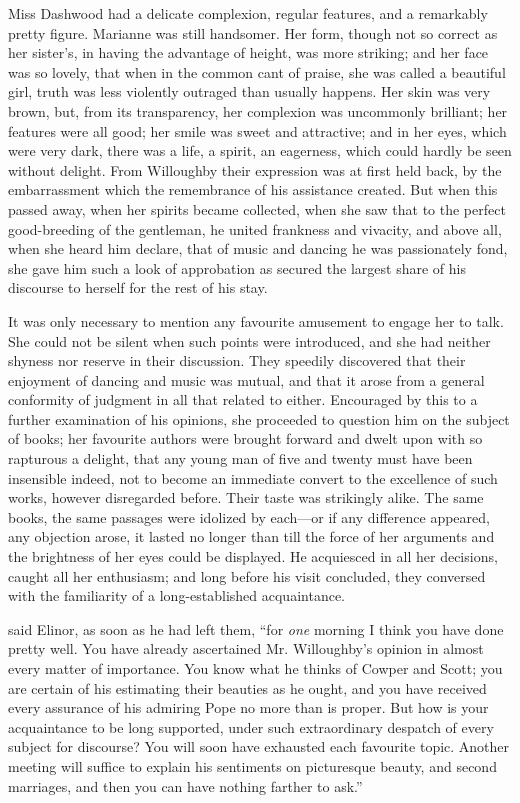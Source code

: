 Miss Dashwood had a delicate complexion, regular features, and a remarkably pretty figure. Marianne was still handsomer. Her form, though not so correct as her sister's, in having the advantage of height, was more striking; and her face was so lovely, that when in the common cant of praise, she was called a beautiful girl, truth was less violently outraged than usually happens. Her skin was very brown, but, from its transparency, her complexion was uncommonly brilliant; her features were all good; her smile was sweet and attractive; and in her eyes, which were very dark, there was a life, a spirit, an eagerness, which could hardly be seen without delight. From Willoughby their expression was at first held back, by the embarrassment which the remembrance of his assistance created. But when this passed away, when her spirits became collected, when she saw that to the perfect good-breeding of the gentleman, he united frankness and vivacity, and above all, when she heard him declare, that of music and dancing he was passionately fond, she gave him such a look of approbation as secured the largest share of his discourse to herself for the rest of his stay.

It was only necessary to mention any favourite amusement to engage her to talk. She could not be silent when such points were introduced, and she had neither shyness nor reserve in their discussion. They speedily discovered that their enjoyment of dancing and music was mutual, and that it arose from a general conformity of judgment in all that related to either. Encouraged by this to a further examination of his opinions, she proceeded to question him on the subject of books; her favourite authors were brought forward and dwelt upon with so rapturous a delight, that any young man of five and twenty must have been insensible indeed, not to become an immediate convert to the excellence of such works, however disregarded before. Their taste was strikingly alike. The same books, the same passages were idolized by each---or if any difference appeared, any objection arose, it lasted no longer than till the force of her arguments and the brightness of her eyes could be displayed. He acquiesced in all her decisions, caught all her enthusiasm; and long before his visit concluded, they conversed with the familiarity of a long-established acquaintance.

 said Elinor, as soon as he had left them, “for {\em one} morning I think you have done pretty well. You have already ascertained Mr. Willoughby's opinion in almost every matter of importance. You know what he thinks of Cowper and Scott; you are certain of his estimating their beauties as he ought, and you have received every assurance of his admiring Pope no more than is proper. But how is your acquaintance to be long supported, under such extraordinary despatch of every subject for discourse? You will soon have exhausted each favourite topic. Another meeting will suffice to explain his sentiments on picturesque beauty, and second marriages, and then you can have nothing farther to ask.”

